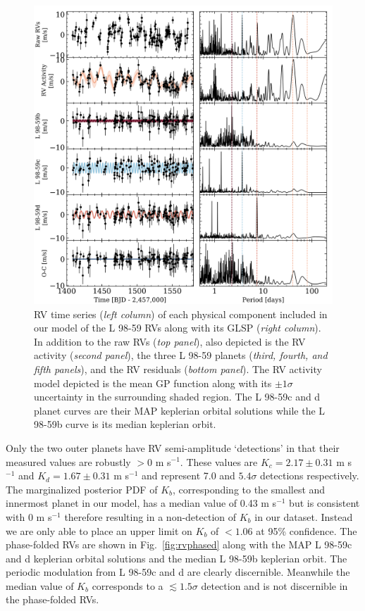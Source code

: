 \documentclass[longauth]{aa}
\newcommand{\mps}{m s$^{-1}$}
\begin{document}
\begin{figure}
    \centering
    \includegraphics[width=.9\hsize]{RVcomponents.png}
    \caption{RV time series (\emph{left column}) of each physical component included in our model of the L 98-59 RVs along with its GLSP (\emph{right column}). In addition to the raw RVs (\emph{top panel}), also depicted is the RV activity (\emph{second panel}), the three L 98-59 planets (\emph{third, fourth, and fifth panels}), and the RV residuals (\emph{bottom panel}). The RV activity model depicted is the mean GP function along with its $\pm 1\sigma$ uncertainty in the surrounding shaded region. The L 98-59c and d planet curves are their MAP keplerian orbital solutions while the L 98-59b curve is its median keplerian orbit.}
    \label{fig:rvcomponents}
\end{figure}

Only the two outer planets have RV semi-amplitude `detections' in that their measured values are robustly $>0$ \mps{.} These values are $K_c=2.17\pm 0.31$ \mps{} and $K_d=1.67\pm 0.31$ \mps{} and represent 7.0 and $5.4\sigma$ detections respectively. The marginalized posterior PDF of $K_b$, corresponding to the smallest and innermost planet in our model, has a median value of 0.43 \mps{} but is consistent with 0 \mps{} therefore resulting in a non-detection of $K_b$ in our dataset. Instead we are only able to place an upper limit on $K_b$ of $<1.06$ at 95\% confidence. The phase-folded RVs are shown in Fig.~\ref{fig:rvphased} along with the MAP L 98-59c and d keplerian orbital solutions and the median L 98-59b keplerian orbit. The periodic modulation from L 98-59c and d are clearly discernible. Meanwhile the median value of $K_b$ corresponds to a $\lesssim 1.5\sigma$ detection and is not discernible in the phase-folded RVs.
\end{document}
